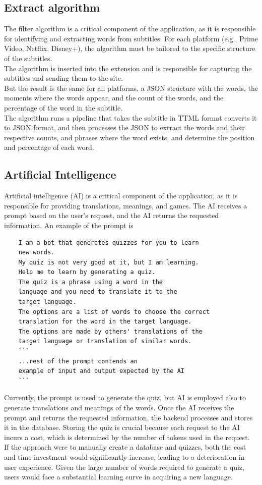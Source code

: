 \documentclass[12pt]{article}
\begin{document}
\subsection{Extract algorithm}
The filter algorithm is a critical component of the application, as it is responsible for identifying and extracting words from subtitles. For each platform (e.g., Prime Video, Netflix, Disney+), the algorithm must be tailored to the specific structure of the subtitles. \\
The algorithm is inserted into the extension and is responsible for capturing the subtitles and sending them to the site. \\
But the result is the same for all platforms, a JSON structure with the words, the moments where the words appear, and the count of the words, and the percentage of the word in the subtitle. \\
The algorithm runs a pipeline that takes the subtitle in TTML format converts it to JSON format, and then processes the JSON to extract the words and their respective counts, and phrases where the word exists, and determine the position and percentage of each word. 
\subsection{Artificial Intelligence}
  Artificial intelligence (AI) is a critical component of the application, as it is responsible for providing translations, meanings, and games. The AI receives a prompt based on the user's request, and the AI returns the requested information. 
  An example of the prompt is \\
  \begin{verbatim}
    I am a bot that generates quizzes for you to learn 
    new words. 
    My quiz is not very good at it, but I am learning.
    Help me to learn by generating a quiz.
    The quiz is a phrase using a word in the 
    language and you need to translate it to the 
    target language.
    The options are a list of words to choose the correct 
    translation for the word in the target language. 
    The options are made by others' translations of the 
    target language or translation of similar words.
    ```
    ...rest of the prompt contends an 
    example of input and output expected by the AI
    ```
  \end{verbatim}
  Currently, the prompt is used to generate the quiz, but AI is employed also to generate translations and meanings of the words. Once the AI receives the prompt and returns the requested information, the backend processes and stores it in the database. Storing the quiz is crucial because each request to the AI incurs a cost, which is determined by the number of tokens used in the request. \\
  If the approach were to manually create a database and quizzes, both the cost and time investment would significantly increase, leading to a deterioration in user experience. Given the large number of words required to generate a quiz, users would face a substantial learning curve in acquiring a new language.
\end{document}

